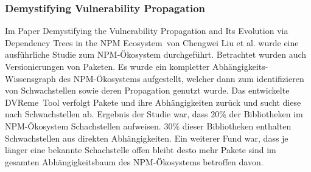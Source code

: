 \subsubsection{Demystifying Vulnerability Propagation} \label{sec:DVP}
Im Paper \glqq Demystifying the Vulnerability Propagation and Its Evolution via Dependency Trees in the NPM Ecosystem\grqq~von Chengwei Liu et al. wurde eine ausführliche Studie zum NPM-Ökosystem durchgeführt.
Betrachtet wurden auch Versionierungen von Paketen.
Es wurde ein kompletter Ab\-hängig\-keits-\-Wissens\-graph des NPM-Ökosystems aufgestellt, welcher dann zum identifizieren von Schwachstellen sowie deren Propagation genutzt wurde.
Das entwickelte \glqq DVReme\grqq~Tool verfolgt Pakete und ihre Abhängigkeiten zurück und sucht diese nach Schwachstellen ab.
Ergebnis der Studie war, dass 20\% der Bibliotheken im NPM-Ökosystem Schachstellen aufweisen.
30\% dieser Bibliotheken enthalten Schwachstellen aus direkten Abhängigkeiten.
Ein weiterer Fund war, dass je länger eine bekannte Schachstelle offen bleibt desto mehr Pakete sind im gesamten Abhängigkeitsbaum des NPM-Ökosystems betroffen davon. 